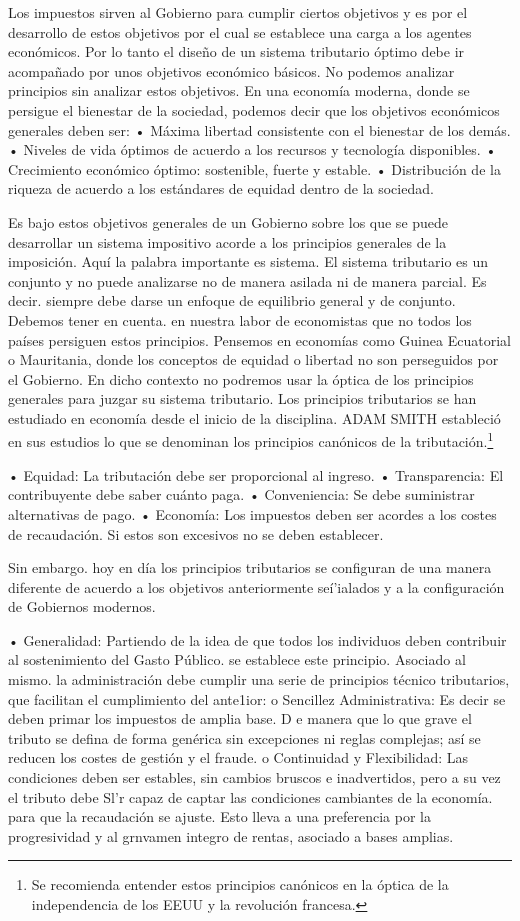 \documentclass[10pt,a4paper]{article}
\begin{document}
{Los impuestos sirven al Gobierno para cumplir ciertos objetivos y es por el desarrollo de estos objetivos por el cual se establece una carga a los agentes económicos. Por lo tanto el diseño de un sistema tributario óptimo debe ir acompañado por unos objetivos económico básicos. No podemos analizar principios sin analizar estos objetivos. En una economía moderna, donde se persigue el bienestar de la sociedad, podemos decir que los objetivos económicos generales deben ser:
• Máxima libertad consistente con el bienestar de los demás.
• Niveles de vida óptimos de acuerdo a los recursos y tecnología disponibles.
• Crecimiento económico óptimo: sostenible, fuerte y estable.
• Distribución de la riqueza de acuerdo a los estándares de equidad dentro de la sociedad.

Es bajo estos objetivos generales de un Gobierno sobre los que se puede desarrollar un sistema impositivo acorde a los principios generales de la imposición. Aquí la palabra importante es sistema. El sistema tributario es un conjunto y no puede analizarse no de manera asilada ni de manera parcial. Es decir. siempre debe darse un enfoque de equilibrio general y de conjunto. Debemos tener en cuenta. en nuestra labor de economistas que no todos los países persiguen estos principios. Pensemos en economías como Guinea Ecuatorial o Mauritania, donde los conceptos de equidad o libertad no son perseguidos por el Gobierno. En dicho contexto no podremos usar la óptica de los principios generales para juzgar su sistema tributario. Los principios tributarios se han estudiado en economía desde el inicio de la disciplina. ADAM SMITH estableció en sus estudios lo que se denominan los principios canónicos de la tributación.\footnote{%
    Se recomienda entender estos principios canónicos en la óptica de la independencia de los EEUU y la revolución francesa.
}


• Equidad: La tributación debe ser proporcional al ingreso.
• Transparencia: El contribuyente debe saber cuánto paga.
• Conveniencia: Se debe suministrar alternativas de pago.
• Economía: Los impuestos deben ser acordes a los costes de recaudación. Si estos son excesivos no se deben establecer. 

Sin embargo. hoy en día los principios tributarios se configuran de una manera diferente de acuerdo a los objetivos anteriormente seí'ialados y a la configuración de Gobiernos modernos.

• Generalidad: Partiendo de la idea de que todos los individuos deben contribuir al sostenimiento del Gasto Público. se establece este principio. Asociado al mismo. la administración debe cumplir una serie de principios técnico tributarios, que facilitan el cumplimiento del ante1ior: o Sencillez Administrativa: Es decir se deben primar los impuestos de amplia base. D e manera que lo que grave el tributo se defina de forma genérica sin excepciones ni reglas complejas; así se reducen los costes de gestión y el fraude. o Continuidad y Flexibilidad: Las condiciones deben ser estables, sin cambios bruscos e inadvertidos, pero a su vez el tributo debe Sl'r capaz de captar las condiciones cambiantes de la economía. para que la recaudación se ajuste. Esto lleva a una preferencia por la progresividad y al grnvamen integro de rentas, asociado a bases amplias.

}
\end{document}
